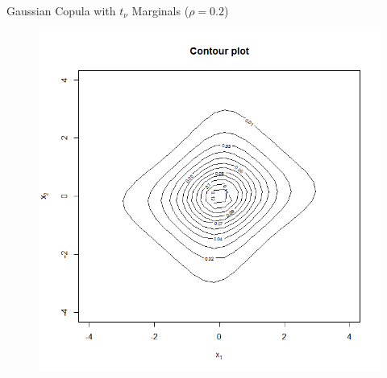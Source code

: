 \documentclass[11pt]{beamer}
\theoremstyle{plain}
\theoremstyle{definition}
\theoremstyle{remark}
\begin{document}
\begin{frame}{Gaussian Copula with $t_\nu$ Marginals ($\rho = 0.2$)}
\begin{figure}[ht]
\begin{minipage}[b]{0.45\linewidth}
            \includegraphics[width=\textwidth]{fig/gauss_t_contour_0_2.png}
        \end{minipage}
    \end{figure}
\end{frame}
%
\end{document}
